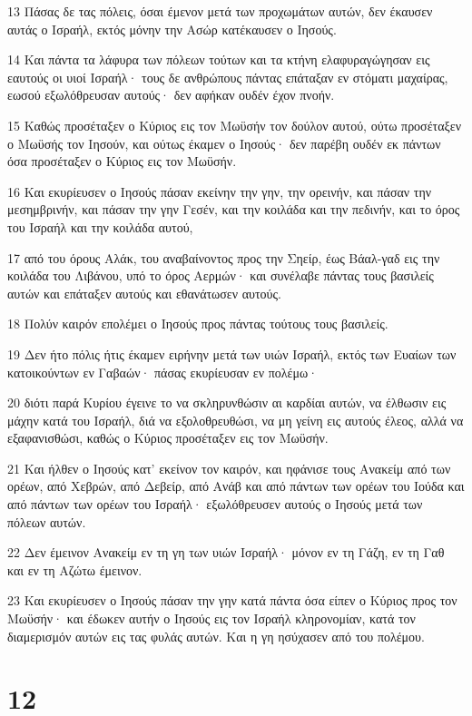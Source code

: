 \par 13 Πάσας δε τας πόλεις, όσαι έμενον μετά των προχωμάτων αυτών, δεν έκαυσεν αυτάς ο Ισραήλ, εκτός μόνην την Ασώρ κατέκαυσεν ο Ιησούς.
\par 14 Και πάντα τα λάφυρα των πόλεων τούτων και τα κτήνη ελαφυραγώγησαν εις εαυτούς οι υιοί Ισραήλ· τους δε ανθρώπους πάντας επάταξαν εν στόματι μαχαίρας, εωσού εξωλόθρευσαν αυτούς· δεν αφήκαν ουδέν έχον πνοήν.
\par 15 Καθώς προσέταξεν ο Κύριος εις τον Μωϋσήν τον δούλον αυτού, ούτω προσέταξεν ο Μωϋσής τον Ιησούν, και ούτως έκαμεν ο Ιησούς· δεν παρέβη ουδέν εκ πάντων όσα προσέταξεν ο Κύριος εις τον Μωϋσήν.
\par 16 Και εκυρίευσεν ο Ιησούς πάσαν εκείνην την γην, την ορεινήν, και πάσαν την μεσημβρινήν, και πάσαν την γην Γεσέν, και την κοιλάδα και την πεδινήν, και το όρος του Ισραήλ και την κοιλάδα αυτού,
\par 17 από του όρους Αλάκ, του αναβαίνοντος προς την Σηείρ, έως Βάαλ-γαδ εις την κοιλάδα του Λιβάνου, υπό το όρος Αερμών· και συνέλαβε πάντας τους βασιλείς αυτών και επάταξεν αυτούς και εθανάτωσεν αυτούς.
\par 18 Πολύν καιρόν επολέμει ο Ιησούς προς πάντας τούτους τους βασιλείς.
\par 19 Δεν ήτο πόλις ήτις έκαμεν ειρήνην μετά των υιών Ισραήλ, εκτός των Ευαίων των κατοικούντων εν Γαβαών· πάσας εκυρίευσαν εν πολέμω·
\par 20 διότι παρά Κυρίου έγεινε το να σκληρυνθώσιν αι καρδίαι αυτών, να έλθωσιν εις μάχην κατά του Ισραήλ, διά να εξολοθρευθώσι, να μη γείνη εις αυτούς έλεος, αλλά να εξαφανισθώσι, καθώς ο Κύριος προσέταξεν εις τον Μωϋσήν.
\par 21 Και ήλθεν ο Ιησούς κατ' εκείνον τον καιρόν, και ηφάνισε τους Ανακείμ από των ορέων, από Χεβρών, από Δεβείρ, από Ανάβ και από πάντων των ορέων του Ιούδα και από πάντων των ορέων του Ισραήλ· εξωλόθρευσεν αυτούς ο Ιησούς μετά των πόλεων αυτών.
\par 22 Δεν έμεινον Ανακείμ εν τη γη των υιών Ισραήλ· μόνον εν τη Γάζη, εν τη Γαθ και εν τη Αζώτω έμεινον.
\par 23 Και εκυρίευσεν ο Ιησούς πάσαν την γην κατά πάντα όσα είπεν ο Κύριος προς τον Μωϋσήν· και έδωκεν αυτήν ο Ιησούς εις τον Ισραήλ κληρονομίαν, κατά τον διαμερισμόν αυτών εις τας φυλάς αυτών. Και η γη ησύχασεν από του πολέμου.

\chapter{12}

